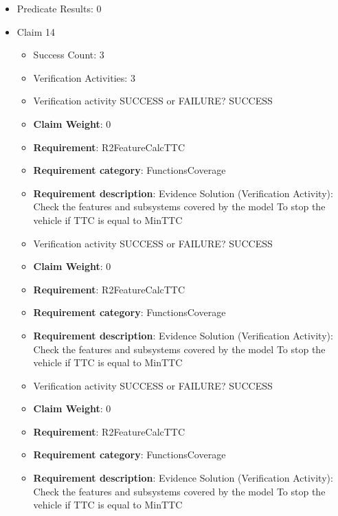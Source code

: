 \documentclass{article}
\begin{document}
\begin{itemize}
\begin{itemize}
					\item Verification activity SUCCESS or FAILURE? SUCCESS
					\item \textbf{Claim Weight}: 0
						\item \textbf{Requirement}: R1FeatureControlPedal 
						\item \textbf{Requirement category}: FunctionsCoverage 
						\item \textbf{Requirement description}: Evidence Solution (Verification Activity): Check the features and subsystems covered by the model  To prevent collision when obstacle is detected
					
				\end{itemize}
				
									    
				\item Predicate Results: 0

  				  \item Claim 14
				\begin{itemize}
			    	\item Success Count: 3 
			    	\item Verification Activities: 3
					\item Verification activity SUCCESS or FAILURE? SUCCESS
					\item \textbf{Claim Weight}: 0
						\item \textbf{Requirement}: R2FeatureCalcTTC 
						\item \textbf{Requirement category}: FunctionsCoverage 
						\item \textbf{Requirement description}: Evidence Solution (Verification Activity): Check the features and subsystems covered by the model  To stop the vehicle if TTC is equal to MinTTC
					
					\item Verification activity SUCCESS or FAILURE? SUCCESS
					\item \textbf{Claim Weight}: 0
						\item \textbf{Requirement}: R2FeatureCalcTTC 
						\item \textbf{Requirement category}: FunctionsCoverage 
						\item \textbf{Requirement description}: Evidence Solution (Verification Activity): Check the features and subsystems covered by the model  To stop the vehicle if TTC is equal to MinTTC
					
					\item Verification activity SUCCESS or FAILURE? SUCCESS
					\item \textbf{Claim Weight}: 0
						\item \textbf{Requirement}: R2FeatureCalcTTC 
						\item \textbf{Requirement category}: FunctionsCoverage 
						\item \textbf{Requirement description}: Evidence Solution (Verification Activity): Check the features and subsystems covered by the model  To stop the vehicle if TTC is equal to MinTTC
					

\end{itemize}
\end{itemize}
\end{document}
